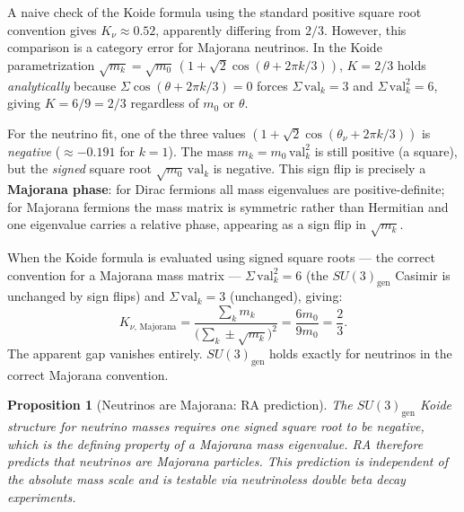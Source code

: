 \documentclass[11pt,a4paper]{article}
\newtheorem{proposition}[theorem]{Proposition}
\begin{document}
A naive check of the Koide formula using the standard positive square root
convention gives $K_\nu \approx 0.52$, apparently differing from $2/3$.
However, this comparison is a category error for Majorana neutrinos.
In the Koide parametrization
$\sqrt{m_k} = \sqrt{m_0}\,(1 + \sqrt{2}\cos(\theta + 2\pi k/3))$,
$K = 2/3$ holds \emph{analytically} because $\Sigma \cos(\theta + 2\pi k/3) = 0$
forces $\Sigma\,\mathrm{val}_k = 3$ and $\Sigma\,\mathrm{val}_k^2 = 6$,
giving $K = 6/9 = 2/3$ regardless of $m_0$ or $\theta$.

For the neutrino fit, one of the three values
$(1 + \sqrt{2}\cos(\theta_\nu + 2\pi k/3))$ is \emph{negative} ($\approx -0.191$
for $k=1$). The mass $m_k = m_0\,\mathrm{val}_k^2$ is still positive (a square),
but the \emph{signed} square root $\sqrt{m_0}\,\mathrm{val}_k$ is negative.
This sign flip is precisely a \textbf{Majorana phase}: for Dirac fermions all
mass eigenvalues are positive-definite; for Majorana fermions the mass matrix is
symmetric rather than Hermitian and one eigenvalue carries a relative phase,
appearing as a sign flip in $\sqrt{m_k}$.

When the Koide formula is evaluated using signed square roots --- the correct
convention for a Majorana mass matrix --- $\Sigma\,\mathrm{val}_k^2 = 6$
(the $SU(3)_{\mathrm{gen}}$ Casimir is unchanged by sign flips)
and $\Sigma\,\mathrm{val}_k = 3$ (unchanged), giving:
\begin{equation}
  K_{\nu,\,\mathrm{Majorana}} = \frac{\sum_k m_k}{\bigl(\sum_k \pm\sqrt{m_k}\bigr)^2}
  = \frac{6m_0}{9m_0} = \frac{2}{3}.
  \label{eq:koide_majorana}
\end{equation}
The apparent gap vanishes entirely. $SU(3)_{\mathrm{gen}}$ holds exactly for
neutrinos in the correct Majorana convention.

\begin{proposition}[Neutrinos are Majorana: RA prediction]
\label{prop:majorana}
The $SU(3)_{\mathrm{gen}}$ Koide structure for neutrino masses requires one
signed square root to be negative, which is the defining property of a Majorana
mass eigenvalue. RA therefore predicts that neutrinos are Majorana particles.
This prediction is independent of the absolute mass scale and is testable via
neutrinoless double beta decay experiments.
\end{proposition}
\end{document}
